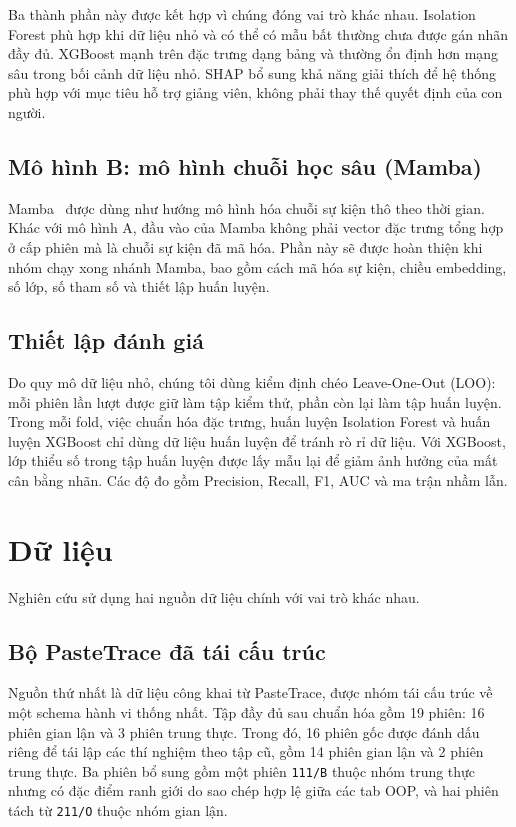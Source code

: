 \documentclass[runningheads]{llncs}
\begin{document}
Ba thành phần này được kết hợp vì chúng đóng vai trò khác nhau. Isolation Forest
phù hợp khi dữ liệu nhỏ và có thể có mẫu bất thường chưa được gán nhãn đầy đủ.
XGBoost mạnh trên đặc trưng dạng bảng và thường ổn định hơn mạng sâu trong bối
cảnh dữ liệu nhỏ. SHAP bổ sung khả năng giải thích để hệ thống phù hợp với mục
tiêu hỗ trợ giảng viên, không phải thay thế quyết định của con người.

\subsection{Mô hình B: mô hình chuỗi học sâu (Mamba)}
Mamba~\cite{mamba} được dùng như hướng mô hình hóa chuỗi sự kiện thô theo thời
gian. Khác với mô hình A, đầu vào của Mamba không phải vector đặc trưng tổng hợp
ở cấp phiên mà là chuỗi sự kiện đã mã hóa. Phần này sẽ được hoàn thiện khi nhóm
chạy xong nhánh Mamba, bao gồm cách mã hóa sự kiện, chiều embedding, số lớp,
số tham số và thiết lập huấn luyện.

\subsection{Thiết lập đánh giá}
Do quy mô dữ liệu nhỏ, chúng tôi dùng kiểm định chéo Leave-One-Out (LOO): mỗi
phiên lần lượt được giữ làm tập kiểm thử, phần còn lại làm tập huấn luyện. Trong
mỗi fold, việc chuẩn hóa đặc trưng, huấn luyện Isolation Forest và huấn luyện
XGBoost chỉ dùng dữ liệu huấn luyện để tránh rò rỉ dữ liệu. Với XGBoost, lớp
thiểu số trong tập huấn luyện được lấy mẫu lại để giảm ảnh hưởng của mất cân
bằng nhãn. Các độ đo gồm Precision, Recall, F1, AUC và ma trận nhầm lẫn.

\section{Dữ liệu}
\label{sec:data}

Nghiên cứu sử dụng hai nguồn dữ liệu chính với vai trò khác nhau.

\subsection{Bộ PasteTrace đã tái cấu trúc}
Nguồn thứ nhất là dữ liệu công khai từ PasteTrace, được nhóm tái cấu trúc về
một schema hành vi thống nhất. Tập đầy đủ sau chuẩn hóa gồm 19 phiên: 16 phiên
gian lận và 3 phiên trung thực. Trong đó, 16 phiên gốc được đánh dấu riêng để
tái lập các thí nghiệm theo tập cũ, gồm 14 phiên gian lận và 2 phiên trung
thực. Ba phiên bổ sung gồm một phiên \texttt{111/B} thuộc nhóm trung thực nhưng
có đặc điểm ranh giới do sao chép hợp lệ giữa các tab OOP, và hai phiên tách từ
\texttt{211/O} thuộc nhóm gian lận.
\end{document}
